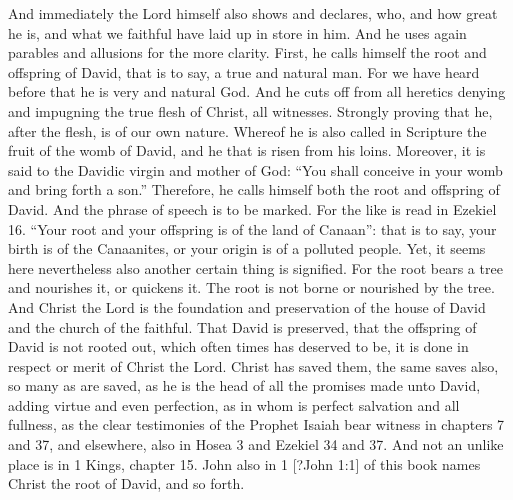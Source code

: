 And immediately the Lord himself also shows and declares, who, and how great he is, and what we faithful have laid up in store in him. And he uses again parables and allusions for the more clarity. First, he calls himself the root and offspring of David, that is to say, a true and natural man. For we have heard before that he is very and natural God. And he cuts off from all heretics denying and impugning the true flesh of Christ, all witnesses. Strongly proving that he, after the flesh, is of our own nature. Whereof he is also called in Scripture the fruit of the womb of David, and he that is risen from his loins. Moreover, it is said to the Davidic virgin and mother of God: “You shall conceive in your womb and bring forth a son.” Therefore, he calls himself both the root and offspring of David. And the phrase of speech is to be marked. For the like is read in Ezekiel 16. “Your root and your offspring is of the land of Canaan”: that is to say, your birth is of the Canaanites, or your origin is of a polluted people. Yet, it seems here nevertheless also another certain thing is signified. For the root bears a tree and nourishes it, or quickens it. The root is not borne or nourished by the tree. And Christ the Lord is the foundation and preservation of the house of David and the church of the faithful. That David is preserved, that the offspring of David is not rooted out, which often times has deserved to be, it is done in respect or merit of Christ the Lord. Christ has saved them, the same saves also, so many as are saved, as he is the head of all the promises made unto David, adding virtue and even perfection, as in whom is perfect salvation and all fullness, as the clear testimonies of the Prophet Isaiah bear witness in chapters 7 and 37, and elsewhere, also in Hosea 3 and Ezekiel 34 and 37. And not an unlike place is in 1 Kings, chapter 15. John also in 1 [?John 1:1] of this book names Christ the root of David, and so forth.

